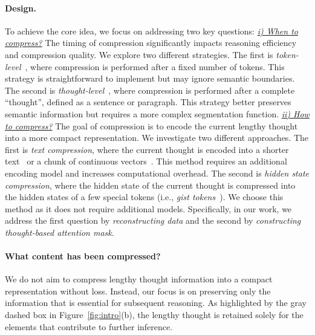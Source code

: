 \paragraph{Design.}
To achieve the core idea, we focus on addressing two key questions:
\underline{\textit{i) When to compress?}} 
The timing of compression significantly impacts reasoning efficiency and compression quality. 
We explore two different strategies.
The first is \textit{token-level}~\citep{iclr25_activation_beacon}, where compression is performed after a fixed number of tokens.
This strategy is straightforward to implement but may ignore semantic boundaries.
The second is \textit{thought-level}~\citep{acl24_anllm}, where compression is performed after a complete ``thought'', defined as a sentence or paragraph.
This strategy better preserves semantic information but requires a more complex segmentation function.
\underline{\textit{ii) How to compress?}}
The goal of compression is to encode the current lengthy thought into a more compact representation.
We investigate two different approaches.
The first is \textit{text compression}, where the current thought is encoded into a shorter text~\citep{emnlp23_llmlingua} or a chunk of continuous vectors~\citep{emnlp23_autocompressors,iclr24_icae}.
This method requires an additional encoding model and increases computational overhead.
The second is \textit{hidden state compression}, where the hidden state of the current thought is compressed into the hidden states of a few special tokens (i.e., \textit{gist tokens}~\citep{nips23_gist}).
We choose this method as it does not require additional models.
Specifically, in our work, we address the first question by \textit{reconstructing data} and the second by \textit{constructing thought-based attention mask}.

\paragraph{What content has been compressed?}
We do not aim to compress lengthy thought information into a compact representation without loss. 
Instead, our focus is on preserving only the information that is essential for subsequent reasoning.
As highlighted by the gray dashed box in Figure~\ref{fig:intro}(b), the lengthy thought is retained solely for the elements that contribute to further inference.


